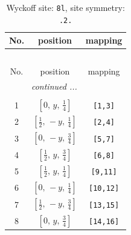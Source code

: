 \documentclass[fleqn,8pt]{jsarticle}
\begin{document}
\begin{longtable}{ccc}
\caption{Wyckoff site: {\tt 8l}, site symmetry: {\tt .2.}}
 \\
 \hline \hline
No. & position & mapping \\ \hline \endfirsthead

\multicolumn{2}{l}{\tablename\ \thetable{}} \\
 \hline \hline
No. & position & mapping \\ \hline \endhead

 \hline \hline
\multicolumn{2}{r}{\footnotesize\it continued ...} \\ \endfoot

 \hline \hline
\multicolumn{2}{r}{} \\ \endlastfoot

1 & $\left[ 0,\, y,\, \frac{1}{4} \right]$ & {\tt [1,3]} \\ \hline
2 & $\left[ \frac{1}{2},\, - y,\, \frac{1}{4} \right]$ & {\tt [2,4]} \\ \hline
3 & $\left[ 0,\, - y,\, \frac{3}{4} \right]$ & {\tt [5,7]} \\ \hline
4 & $\left[ \frac{1}{2},\, y,\, \frac{3}{4} \right]$ & {\tt [6,8]} \\ \hline
5 & $\left[ \frac{1}{2},\, y,\, \frac{1}{4} \right]$ & {\tt [9,11]} \\ \hline
6 & $\left[ 0,\, - y,\, \frac{1}{4} \right]$ & {\tt [10,12]} \\ \hline
7 & $\left[ \frac{1}{2},\, - y,\, \frac{3}{4} \right]$ & {\tt [13,15]} \\ \hline
8 & $\left[ 0,\, y,\, \frac{3}{4} \right]$ & {\tt [14,16]} \\
\end{longtable}
\renewcommand{\arraystretch}{1.2}
\end{document}
